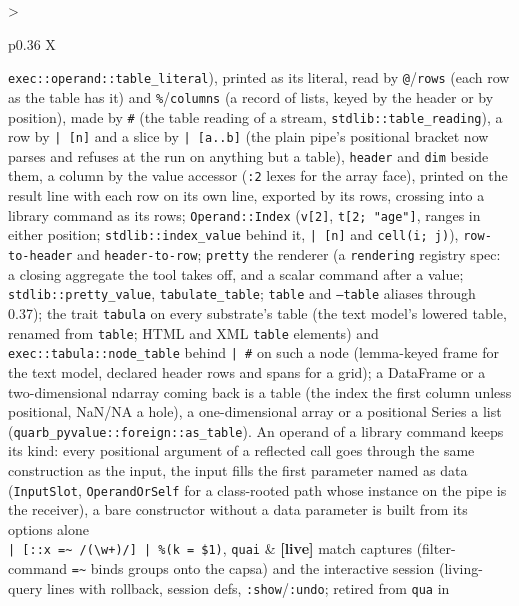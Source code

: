 \documentclass{report}
\newcommand{\live}{\textbf{\textcolor{blue!60!black}{[live]}}\xspace}
\begin{document}
\begin{xltabular}{\textwidth}{>{\raggedright\arraybackslash}p{0.36\textwidth} X}
    \texttt{exec::operand::table\_literal}), printed as its literal,
    read by \texttt{@}/\texttt{rows} (each row as the table has it)
    and \texttt{\%}/\texttt{columns} (a record of lists, keyed by
    the header or by position), made by \texttt{\#} (the table
    reading of a stream, \texttt{stdlib::table\_reading}), a row by
    \texttt{| [n]} and a slice by \texttt{| [a..b]} (the plain pipe's
    positional bracket now parses and refuses at the run on anything
    but a table), \texttt{header} and \texttt{dim} beside them, a
    column by the value accessor (\texttt{:2} lexes for the array
    face), printed on the result line with each row on its own line,
    exported by its rows, crossing into a library command as its
    rows; \texttt{Operand::Index} (\texttt{v[2]}, \texttt{t[2; "age"]},
    ranges in either position; \texttt{stdlib::index\_value} behind it,
    \texttt{| [n]} and \texttt{cell(i; j)}), \texttt{row-to-header} and
    \texttt{header-to-row}; \texttt{pretty} the renderer (a
    \texttt{rendering} registry spec: a closing aggregate the tool
    takes off, and a scalar command after a value;
    \texttt{stdlib::pretty\_value}, \texttt{tabulate\_table}; \texttt{table}
    and \texttt{--table} aliases through 0.37); the trait \texttt{tabula} on every
    substrate's table (the text model's lowered table, renamed from
    \texttt{table}; HTML and XML \texttt{table} elements) and
    \texttt{exec::tabula::node\_table} behind \texttt{| \#} on such a
    node (lemma-keyed frame for the text model, declared header rows
    and spans for a grid); a DataFrame or a two-dimensional ndarray coming back is a
    table (the index the first column unless positional, NaN/NA a
    hole), a one-dimensional array or a positional Series a list
    (\texttt{quarb\_pyvalue::foreign::as\_table}). An operand of a library
    command keeps its kind: every positional argument of a reflected
    call goes through the same construction as the input, the input
    fills the first parameter named as data (\texttt{InputSlot},
    \texttt{OperandOrSelf} for a class-rooted path whose instance on
    the pipe is the receiver), a bare constructor without a data
    parameter is built from its options alone \\
\texttt{| [::x =\textasciitilde{} /(\textbackslash{}w+)/] | \%(k = \$1)},
\texttt{quai}
  & \live match captures (filter-command \texttt{=\textasciitilde}
    binds groups onto the capsa) and the interactive session
    (living-query lines with rollback, session defs,
    \texttt{:show}/\texttt{:undo}; retired from \texttt{qua} in

\end{xltabular}
\end{document}
